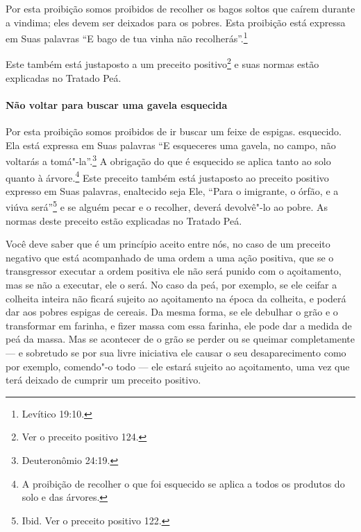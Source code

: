 \begin{multicols}{2}
Por esta proibição somos proibidos de recolher os bagos soltos que
caírem durante a vindima; eles devem ser deixados para os pobres. Esta
proibição está expressa em Suas palavras ``E bago de tua vinha não
recolherás''.\footnote{Levítico 19:10.}

Este também está justaposto a um preceito positivo\footnote{Ver o preceito positivo 124.}
e suas normas estão explicadas no Tratado Peá\starr.

\paragraph{Não voltar para buscar uma gavela esquecida}

Por esta proibição somos proibidos de ir buscar um feixe de espigas.
esquecido. Ela está expressa em Suas palavras ``E esqueceres uma gavela,
no campo, não voltarás a tomá"-la''.\footnote{Deuteronômio 24:19.} A obrigação do
que é esquecido se aplica tanto ao solo quanto à
árvore.\footnote{A proibição de recolher o que foi esquecido se aplica a todos os
  produtos do solo e das árvores.} Este preceito também está justaposto ao
preceito positivo expresso em Suas palavras, enaltecido seja Ele, ``Para
o imigrante, o órfão, e a viúva será''\footnote{Ibid. Ver o preceito positivo 122.} e
se alguém pecar e o recolher, deverá devolvê"-lo ao pobre. As normas
deste preceito estão explicadas no Tratado Peá\starr.

Você deve saber que é um princípio aceito entre nós, no caso de um
preceito negativo que está acompanhado de uma ordem a uma ação positiva,
que se o transgressor executar a ordem positiva ele não será punido com
o açoitamento, mas se não a executar, ele o será. No caso da peá\starr,
por exemplo, se ele ceifar a colheita inteira não ficará sujeito ao
açoitamento na época da colheita, e poderá dar aos pobres espigas de
cereais. Da mesma forma, se ele debulhar o grão e o transformar em
farinha, e fizer massa com essa farinha, ele pode dar a medida de
peá\starr{} da massa. Mas se acontecer de o grão se perder ou se queimar
completamente --- e sobretudo se por sua livre iniciativa ele causar o
seu desaparecimento como por exemplo, comendo"-o
todo --- ele estará sujeito ao açoitamento, uma vez que terá deixado de
cumprir um preceito positivo.


\end{multicols}

